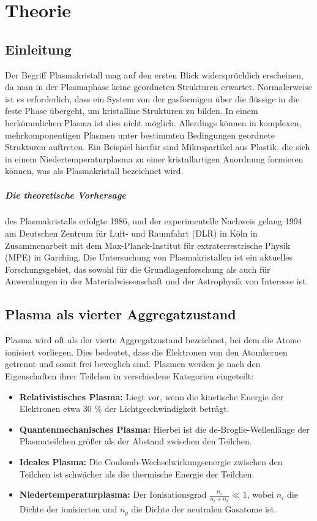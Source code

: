 \documentclass[12pt,a4paper,ngerman]{report}
\begin{document}
\chapter{Theorie}
\section{Einleitung} Der Begriff \glqq{}Plasmakristall\grqq{} mag auf den ersten Blick widersprüchlich erscheinen, da man in der Plasmaphase keine geordneten Strukturen erwartet. Normalerweise ist es erforderlich, dass ein System von der gasförmigen über die flüssige in die feste Phase übergeht, um kristalline Strukturen zu bilden. In einem herkömmlichen Plasma ist dies nicht möglich. Allerdings können in komplexen, mehrkomponentigen Plasmen unter bestimmten Bedingungen geordnete Strukturen auftreten. Ein Beispiel hierfür sind Mikropartikel aus Plastik, die sich in einem Niedertemperaturplasma zu einer kristallartigen Anordnung formieren können, was als Plasmakristall bezeichnet wird.

\paragraph{Die theoretische Vorhersage} des Plasmakristalls erfolgte 1986, und der experimentelle Nachweis gelang 1994 am Deutschen Zentrum für Luft- und Raumfahrt (DLR) in Köln in Zusammenarbeit mit dem Max-Planck-Institut für extraterrestrische Physik (MPE) in Garching. Die Untersuchung von Plasmakristallen ist ein aktuelles Forschungsgebiet, das sowohl für die Grundlagenforschung als auch für Anwendungen in der Materialwissenschaft und der Astrophysik von Interesse ist.

\section{Plasma als vierter Aggregatzustand}
Plasma wird oft als der vierte Aggregatzustand bezeichnet, bei dem die Atome ionisiert vorliegen. Dies bedeutet, dass die Elektronen von den Atomkernen getrennt und somit frei beweglich sind. Plasmen werden je nach den Eigenschaften ihrer Teilchen in verschiedene Kategorien eingeteilt:

\begin{itemize}
    \item \textbf{Relativistisches Plasma:} Liegt vor, wenn die kinetische Energie der Elektronen etwa 30 \% der Lichtgeschwindigkeit beträgt.
    \item \textbf{Quantenmechanisches Plasma:} Hierbei ist die de-Broglie-Wellenlänge der Plasmateilchen größer als der Abstand zwischen den Teilchen.
    \item \textbf{Ideales Plasma:} Die Coulomb-Wechselwirkungsenergie zwischen den Teilchen ist schwächer als die thermische Energie der Teilchen.
    \item \textbf{Niedertemperaturplasma:} Der Ionisationsgrad \( \frac{n_i}{n_i + n_g} \ll 1 \), wobei \( n_i \) die Dichte der ionisierten und \( n_g \) die Dichte der neutralen Gasatome ist.
\end{itemize}
\end{document}
